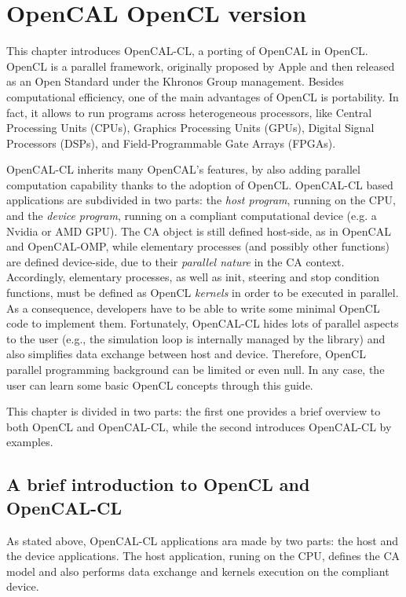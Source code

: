 \chapter{OpenCAL OpenCL version}\label{ch:opencal-cl}

This chapter introduces OpenCAL-CL, a porting of OpenCAL in
OpenCL. OpenCL is a parallel framework, originally proposed by Apple
and then released as an Open Standard under the Khronos Group
management. Besides computational efficiency, one of the main
advantages of OpenCL is portability. In fact, it allows to run
programs across heterogeneous processors, like Central Processing Units
(CPUs), Graphics Processing Units (GPUs), Digital Signal Processors
(DSPs), and Field-Programmable Gate Arrays (FPGAs).

OpenCAL-CL inherits many OpenCAL's features, by also adding parallel
computation capability thanks to the adoption of OpenCL. OpenCAL-CL
based applications are subdivided in two parts: the \emph{host
  program}, running on the CPU, and the \emph{device program}, running
on a compliant computational device (e.g. a Nvidia or AMD GPU). The CA
object is still defined host-side, as in OpenCAL and OpenCAL-OMP,
while elementary processes (and possibly other functions) are defined
device-side, due to their \textsl{parallel nature} in the CA
context. Accordingly, elementary processes, as well as init, steering
and stop condition functions, must be defined as OpenCL \emph{kernels}
in order to be executed in parallel. As a consequence, developers have
to be able to write some minimal OpenCL code to implement
them. Fortunately, OpenCAL-CL hides lots of parallel aspects to the
user (e.g., the simulation loop is internally managed by the library)
and also simplifies data exchange between host and device. Therefore,
OpenCL parallel programming background can be limited or even null. In
any case, the user can learn some basic OpenCL concepts through this
guide.

This chapter is divided in two parts: the first one provides a brief
overview to both OpenCL and OpenCAL-CL, while the second introduces OpenCAL-CL by examples.


\section{A brief introduction to OpenCL and OpenCAL-CL}\label{sec:opencalclstructure}

As stated above, OpenCAL-CL applications ara made by two parts: the
host and the device applications. The host application, runing on the
CPU, defines the CA model and also performs data exchange and kernels
execution on the compliant device.


